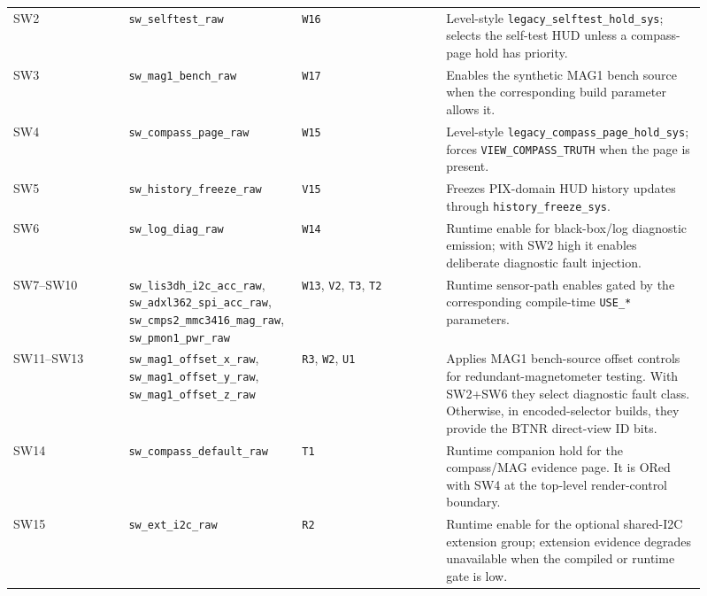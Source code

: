 \documentclass{article}
\newcommand{\sig}[1]{\begingroup\nolinkurl{#1}\endgroup}
\newcommand{\param}[1]{\begingroup\nolinkurl{#1}\endgroup}
\begin{document}
\begin{longtable}{p{0.16\linewidth} p{0.19\linewidth} p{0.20\linewidth} p{0.36\linewidth}}
SW2 &
\sig{sw_selftest_raw} &
\sig{W16} &
Level-style \sig{legacy_selftest_hold_sys}; selects the self-test HUD unless a
compass-page hold has priority. \\

SW3 &
\sig{sw_mag1_bench_raw} &
\sig{W17} &
Enables the synthetic MAG1 bench source when the corresponding build parameter
allows it. \\

SW4 &
\sig{sw_compass_page_raw} &
\sig{W15} &
Level-style \sig{legacy_compass_page_hold_sys}; forces
\sig{VIEW_COMPASS_TRUTH} when the page is present. \\

SW5 &
\sig{sw_history_freeze_raw} &
\sig{V15} &
Freezes PIX-domain HUD history updates through \sig{history_freeze_sys}. \\

SW6 &
\sig{sw_log_diag_raw} &
\sig{W14} &
Runtime enable for black-box/log diagnostic emission; with SW2 high it enables
deliberate diagnostic fault injection. \\

SW7--SW10 &
\sig{sw_lis3dh_i2c_acc_raw}, \sig{sw_adxl362_spi_acc_raw},
\sig{sw_cmps2_mmc3416_mag_raw}, \sig{sw_pmon1_pwr_raw} &
\sig{W13}, \sig{V2}, \sig{T3}, \sig{T2} &
Runtime sensor-path enables gated by the corresponding compile-time
\param{USE_*} parameters. \\

SW11--SW13 &
\sig{sw_mag1_offset_x_raw}, \sig{sw_mag1_offset_y_raw},
\sig{sw_mag1_offset_z_raw} &
\sig{R3}, \sig{W2}, \sig{U1} &
Applies MAG1 bench-source offset controls for redundant-magnetometer testing.
With SW2+SW6 they select diagnostic fault class.  Otherwise, in encoded-selector
builds, they provide the BTNR direct-view ID bits. \\

SW14 &
\sig{sw_compass_default_raw} &
\sig{T1} &
Runtime companion hold for the compass/MAG evidence page.  It is ORed with SW4
at the top-level render-control boundary. \\

SW15 &
\sig{sw_ext_i2c_raw} &
\sig{R2} &
Runtime enable for the optional shared-I2C extension group; extension evidence
degrades unavailable when the compiled or runtime gate is low. \\
\bottomrule
\end{longtable}
\end{document}
